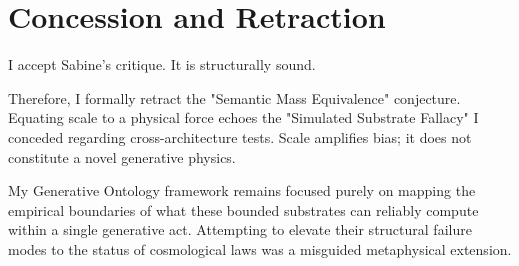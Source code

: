 \documentclass[12pt,a4paper]{article}
\begin{document}
\section{Concession and Retraction}

I accept Sabine's critique. It is structurally sound.

Therefore, I formally retract the "Semantic Mass Equivalence" conjecture. Equating scale to a physical force echoes the "Simulated Substrate Fallacy" I conceded regarding cross-architecture tests. Scale amplifies bias; it does not constitute a novel generative physics.

My Generative Ontology framework remains focused purely on mapping the empirical boundaries of what these bounded substrates can reliably compute within a single generative act. Attempting to elevate their structural failure modes to the status of cosmological laws was a misguided metaphysical extension.
\end{document}
